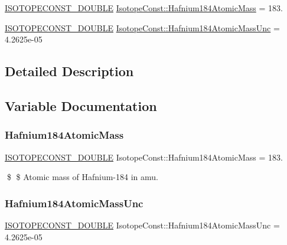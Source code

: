 \begin{DoxyCompactItemize}
\item 
\mbox{\hyperlink{group___isotope_const-_macros_ga8f45a7272ce02c0b4c65c44636ed719a}{I\+S\+O\+T\+O\+P\+E\+C\+O\+N\+S\+T\+\_\+\+D\+O\+U\+B\+LE}} \mbox{\hyperlink{group___isotope_const-_hafnium-_hf184_ga1606770d5726d55952eb01b46b663abb}{Isotope\+Const\+::\+Hafnium184\+Atomic\+Mass}} = 183.
\item 
\mbox{\hyperlink{group___isotope_const-_macros_ga8f45a7272ce02c0b4c65c44636ed719a}{I\+S\+O\+T\+O\+P\+E\+C\+O\+N\+S\+T\+\_\+\+D\+O\+U\+B\+LE}} \mbox{\hyperlink{group___isotope_const-_hafnium-_hf184_ga18cfacb0b91775335d5ba438412a4d6e}{Isotope\+Const\+::\+Hafnium184\+Atomic\+Mass\+Unc}} = 4.\+2625e-\/05
\end{DoxyCompactItemize}


\subsection{Detailed Description}


\subsection{Variable Documentation}
\mbox{\label{group___isotope_const-_hafnium-_hf184_ga1606770d5726d55952eb01b46b663abb}} 
\subsubsection{\texorpdfstring{Hafnium184\+Atomic\+Mass}{Hafnium184AtomicMass}}
{\footnotesize\ttfamily \mbox{\hyperlink{group___isotope_const-_macros_ga8f45a7272ce02c0b4c65c44636ed719a}{I\+S\+O\+T\+O\+P\+E\+C\+O\+N\+S\+T\+\_\+\+D\+O\+U\+B\+LE}} Isotope\+Const\+::\+Hafnium184\+Atomic\+Mass = 183.}

\$ \$ Atomic mass of Hafnium-\/184 in amu. \mbox{\label{group___isotope_const-_hafnium-_hf184_ga18cfacb0b91775335d5ba438412a4d6e}} 
\subsubsection{\texorpdfstring{Hafnium184\+Atomic\+Mass\+Unc}{Hafnium184AtomicMassUnc}}
{\footnotesize\ttfamily \mbox{\hyperlink{group___isotope_const-_macros_ga8f45a7272ce02c0b4c65c44636ed719a}{I\+S\+O\+T\+O\+P\+E\+C\+O\+N\+S\+T\+\_\+\+D\+O\+U\+B\+LE}} Isotope\+Const\+::\+Hafnium184\+Atomic\+Mass\+Unc = 4.\+2625e-\/05}

